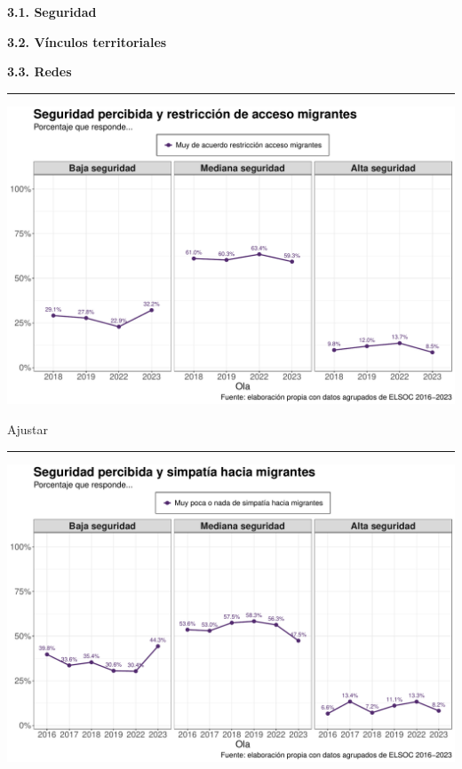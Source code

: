 \documentclass[
  spanish,
  letterpaper,
  DIV=11,
  numbers=noendperiod,
  oneside]{scrartcl}
\begin{document}
{\textbf{3.1. Seguridad}}

{\textbf{3.2. Vínculos territoriales}}

{\textbf{3.3. Redes}}

\begin{center}\rule{0.5\linewidth}{0.5pt}\end{center}

\begin{center}
\includegraphics[width=1\linewidth,height=\textheight,keepaspectratio]{cep_2025_files/figure-pdf/unnamed-chunk-4-1.pdf}
\end{center}

Ajustar

\begin{center}\rule{0.5\linewidth}{0.5pt}\end{center}

\begin{center}
\includegraphics[width=1\linewidth,height=\textheight,keepaspectratio]{cep_2025_files/figure-pdf/unnamed-chunk-5-1.pdf}
\end{center}
\end{document}
